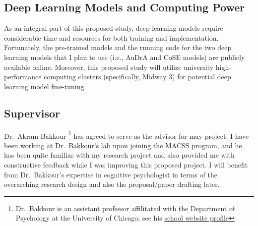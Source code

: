 \documentclass[../Proposal.tex]{subfiles}
\begin{document}
\subsection*{Deep Learning Models and Computing Power}
As an integral part of this proposed study, deep learning models require considerable time and resources for both training and implementation. Fortunately, the pre-trained models and the running code for the two deep learning models that I plan to use (i.e., AuDrA and CoSE models) are publicly available online. Moreover, this proposed study will utilize university high-performance computing clusters (specifically, Midway 3) for potential deep learning model fine-tuning.

\subsection*{Supervisor}
Dr.~Akram Bakkour \footnote{Dr.~Bakkour is an assistant professor affilitated with the Department of Psychology at the University of Chicago; see his \href{https://psychology.uchicago.edu/directory/Akram-Bakkour}{school website profile}} has agreed to serve as the advisor for muy project. I have been working at Dr.~Bakkour's lab upon joining the MACSS program, and he has been quite familiar with my research project and also provided me with constructive feedback while I was improving this proposed project. I will benefit from Dr.~Bakkour's expertise in cognitive psychologist in terms of the overarching research design and also the proposal/paper drafting later. 
\end{document}
